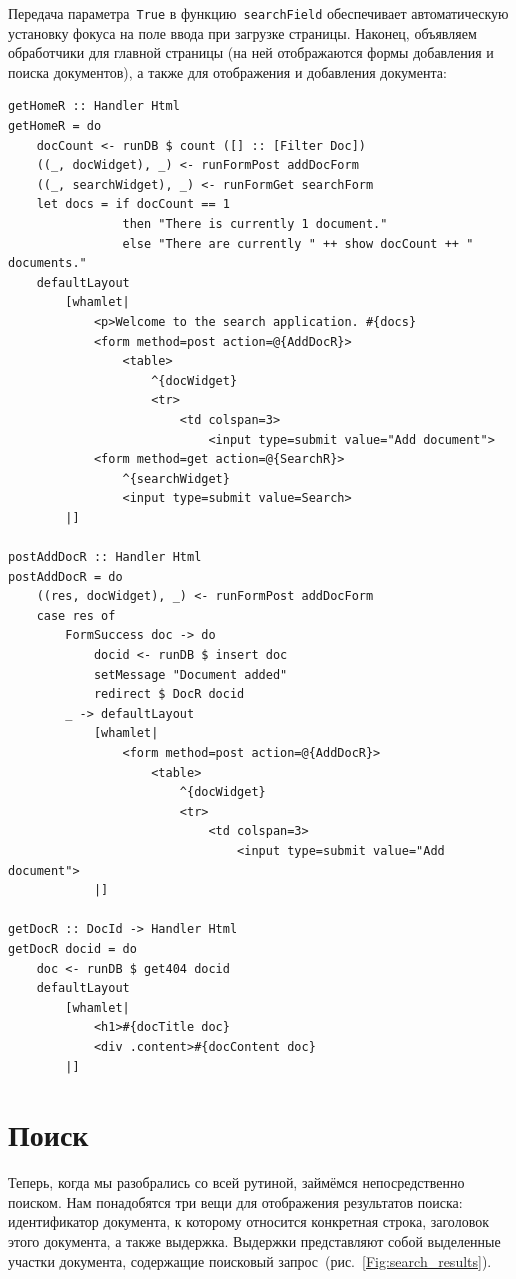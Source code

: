 Передача параметра~\lstinline'True' в функцию~\lstinline'searchField'
обеспечивает автоматическую установку фокуса на поле ввода при загрузке
страницы. Наконец, объявляем обработчики для главной страницы (на ней
отображаются формы добавления и поиска документов), а также для отображения и
добавления документа:
\begin{lstlisting}
getHomeR :: Handler Html
getHomeR = do
    docCount <- runDB $ count ([] :: [Filter Doc])
    ((_, docWidget), _) <- runFormPost addDocForm
    ((_, searchWidget), _) <- runFormGet searchForm
    let docs = if docCount == 1
                then "There is currently 1 document."
                else "There are currently " ++ show docCount ++ " documents."
    defaultLayout
        [whamlet|
            <p>Welcome to the search application. #{docs}
            <form method=post action=@{AddDocR}>
                <table>
                    ^{docWidget}
                    <tr>
                        <td colspan=3>
                            <input type=submit value="Add document">
            <form method=get action=@{SearchR}>
                ^{searchWidget}
                <input type=submit value=Search>
        |]

postAddDocR :: Handler Html
postAddDocR = do
    ((res, docWidget), _) <- runFormPost addDocForm
    case res of
        FormSuccess doc -> do
            docid <- runDB $ insert doc
            setMessage "Document added"
            redirect $ DocR docid
        _ -> defaultLayout
            [whamlet|
                <form method=post action=@{AddDocR}>
                    <table>
                        ^{docWidget}
                        <tr>
                            <td colspan=3>
                                <input type=submit value="Add document">
            |]

getDocR :: DocId -> Handler Html
getDocR docid = do
    doc <- runDB $ get404 docid
    defaultLayout
        [whamlet|
            <h1>#{docTitle doc}
            <div .content>#{docContent doc}
        |]
\end{lstlisting}%

\section{Поиск}
Теперь, когда мы разобрались со всей рутиной, займёмся непосредственно поиском.
Нам понадобятся три вещи для отображения результатов поиска: идентификатор
документа, к которому относится конкретная строка, заголовок этого документа, а
также выдержка. Выдержки представляют собой выделенные участки документа,
содержащие поисковый запрос~(рис.~\ref{Fig:search_results}).

